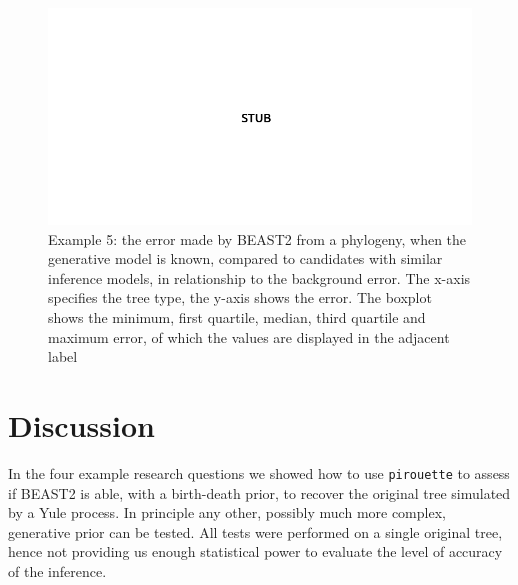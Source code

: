 \documentclass{article}
\begin{document}
\begin{figure}[h]
  \includegraphics[width=\textwidth]{example_5_errors.png}
  \caption{
    Example 5: the error made by BEAST2 from a phylogeny, when the generative model is known, compared to candidates with similar inference models, in relationship to the background error.
    The x-axis specifies the tree type, the y-axis shows the error.
    The boxplot shows the minimum, first quartile, median, third 
    quartile and maximum error, of which the values are displayed 
    in the adjacent label
  }
  \label{fig:example_5}
\end{figure}

\section{Discussion}

In the four example research questions we showed how to use \verb;pirouette; 
to assess if BEAST2 is able, with a birth-death prior, 
to recover the original tree simulated by a Yule process. 
In principle any other, possibly much more complex, 
generative prior can be tested.
All tests were performed on a single original tree, 
hence not providing us enough statistical power to 
evaluate the level of accuracy of the inference. 
\end{document}

